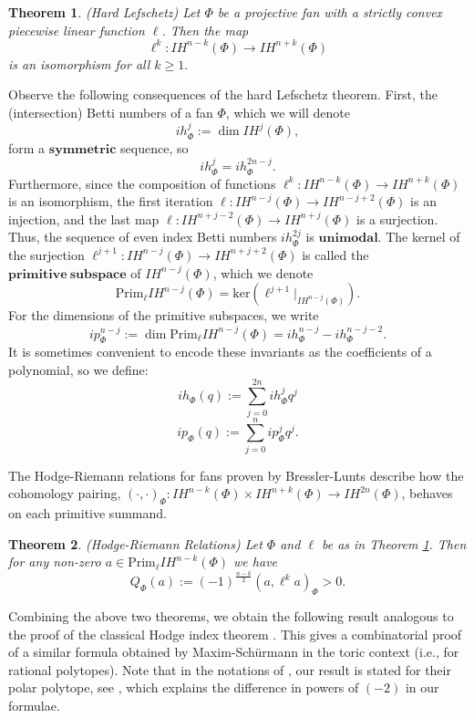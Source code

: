 \documentclass[12pt,leqno,twoside]{amsart}
\newtheorem{thm}{Theorem}[section]
\begin{document}
\begin{thm} (Hard Lefschetz) \label{th31} Let $\Phi$ be a projective fan with a strictly convex piecewise linear function $\ell$. Then the map \[\ell^k:IH^{n-k}(\Phi)\rightarrow IH^{n+k}(\Phi)\] is an isomorphism for all $k\geq 1.$
\end{thm}

Observe the following consequences of the hard Lefschetz theorem. First, the (intersection) Betti numbers of a fan $\Phi$, which we will denote \[ih^j_\Phi:=\dim IH^j(\Phi),\] form a $\mathbf{symmetric}$ sequence, so \[ih_\Phi^j=ih_\Phi^{2n-j}.\] Furthermore, since the composition of functions $\ell^{k}:IH^{n-k}(\Phi)\rightarrow IH^{n+k}(\Phi)$ is an isomorphism, the first iteration $\ell:IH^{n-j}(\Phi)\rightarrow IH^{n-j+2}(\Phi)$ is an injection, and the last map $\ell:IH^{n+j-2}(\Phi)\rightarrow IH^{n+j}(\Phi)$ is a surjection. Thus, the sequence of even index Betti numbers $ih_\Phi^{2j}$ is $\mathbf{unimodal}$. The kernel of the surjection $\ell^{j+1}:IH^{n-j}(\Phi)\rightarrow IH^{n+j+2}(\Phi)$ is called the $\mathbf{primitive\ subspace}$ of $IH^{n-j}(\Phi)$, which we denote \[\text{Prim}_\ell IH^{n-j}(\Phi)=\text{ker}(\ell^{j+1}|_{IH^{n-j}(\Phi)}).\] For the dimensions of the primitive subspaces, we write \[ip_\Phi^{n-j}:=\dim \text{Prim}_\ell IH^{n-j}(\Phi)=ih_\Phi^{n-j}-ih_\Phi^{n-j-2}.\] It is sometimes convenient to encode these invariants as the coefficients of a polynomial, so we define: $$ih_\Phi(q):=\sum_{j=0}^{2n} ih_\Phi^j q^j$$
$$ip_\Phi(q):=\sum_{j=0}^{n} ip_\Phi^j q^j.$$


The Hodge-Riemann relations for fans proven by Bressler-Lunts \cite{BL2} describe how the cohomology pairing, $(\cdot,\cdot)_\Phi:IH^{n-k}(\Phi)\times IH^{n+k}(\Phi)\rightarrow IH^{2n}(\Phi)$, behaves on each primitive summand.


\begin{thm} (Hodge-Riemann Relations) Let $\Phi$ and $\ell$ be as in Theorem \ref{th31}. Then for any non-zero $a\in \text{Prim}_\ell IH^{n-k}(\Phi)$ we have $$Q_\Phi(a):=(-1)^\frac{n-k}{2}(a,\ell^ka)_\Phi>0.$$
\end{thm}

Combining the above two theorems, we obtain the following result analogous to the proof of the classical Hodge index theorem \cite{H}. This gives a combinatorial proof of a similar formula obtained by Maxim-Sch\"urmann \cite[Example 5.8, Example 6.7]{MS} in the toric context (i.e., for rational polytopes). Note that in the notations of \cite{MS}, our result is stated for their polar polytope, see \cite[Formula (6.13)]{MS}, which explains the difference in powers of $(-2)$ in our formulae. 
\end{document}
